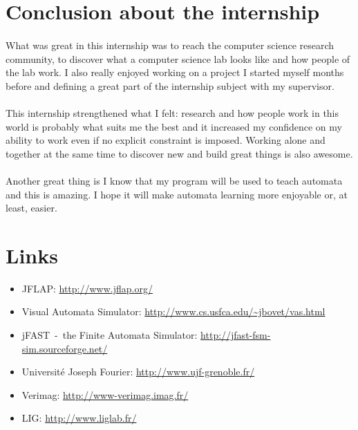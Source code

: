 \documentclass{article}
\begin{document}
\begin{sloppypar}
\newpage


\section{ Conclusion about the internship}


\paragraph{}
What was great in this internship was to reach the computer science research community, to discover what a computer science lab looks like and how people of the lab work. I also really enjoyed working on a project I started myself months before and defining a great part of the internship subject with my supervisor.

   
\paragraph{}
This internship strengthened what I felt: research and how people work in this world is probably what suits me the best and it increased my confidence on my ability to work even if no explicit constraint is imposed. Working alone and together at the same time to discover new and build great things is also awesome.

   
\paragraph{}
Another great thing is I know that my program will be used to teach automata and this is amazing. I hope it will make automata learning more enjoyable or, at least, easier.



\section{ Links}


\begin{itemize}
	\item{ JFLAP: \href{http://www.jflap.org/}{http://www.jflap.org/}}
	\item{ Visual Automata Simulator: \href{http://www.cs.usfca.edu/~jbovet/vas.html}{http://www.cs.usfca.edu/\textasciitilde jbovet/vas.html}}
	\item{ jFAST - the Finite Automata Simulator: \href{http://jfast-fsm-sim.sourceforge.net/}{http://jfast-fsm-sim.sourceforge.net/}}
	\item{ Université Joseph Fourier: \href{http://www.ujf-grenoble.fr/}{http://www.ujf-grenoble.fr/}}
	\item{ Verimag: \href{http://www-verimag.imag.fr/}{http://www-verimag.imag.fr/}}
	\item{ LIG: \href{http://www.liglab.fr/}{http://www.liglab.fr/}}
\end{itemize}





\end{sloppypar}
\end{document}
